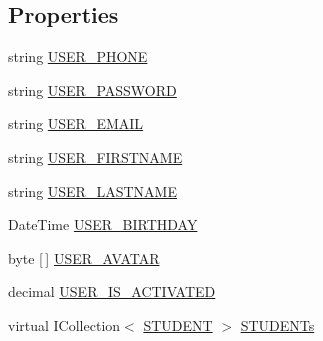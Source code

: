 \subsection*{Properties}
\begin{DoxyCompactItemize}
\item 
string \hyperlink{class_e_f_oracle_1_1_model_1_1_u_s_e_r_af17afbb891a92e46288022d64b7a8393}{U\+S\+E\+R\+\_\+\+P\+H\+O\+NE}
\item 
string \hyperlink{class_e_f_oracle_1_1_model_1_1_u_s_e_r_a89dccb5c29dd3c072978fc465500c7af}{U\+S\+E\+R\+\_\+\+P\+A\+S\+S\+W\+O\+RD}
\item 
string \hyperlink{class_e_f_oracle_1_1_model_1_1_u_s_e_r_a8f3418b6e13510654282c0079b2b52d5}{U\+S\+E\+R\+\_\+\+E\+M\+A\+IL}
\item 
string \hyperlink{class_e_f_oracle_1_1_model_1_1_u_s_e_r_a92206079968e1447584054eb4da2be62}{U\+S\+E\+R\+\_\+\+F\+I\+R\+S\+T\+N\+A\+ME}
\item 
string \hyperlink{class_e_f_oracle_1_1_model_1_1_u_s_e_r_a1521baf6b374d79498dc8d875190a772}{U\+S\+E\+R\+\_\+\+L\+A\+S\+T\+N\+A\+ME}
\item 
Date\+Time \hyperlink{class_e_f_oracle_1_1_model_1_1_u_s_e_r_a20f6ec89e28a3aa3dfd8b934dce96368}{U\+S\+E\+R\+\_\+\+B\+I\+R\+T\+H\+D\+AY}
\item 
byte \mbox{[}$\,$\mbox{]} \hyperlink{class_e_f_oracle_1_1_model_1_1_u_s_e_r_aada09caebf78d842b47abada413e5c90}{U\+S\+E\+R\+\_\+\+A\+V\+A\+T\+AR}
\item 
decimal \hyperlink{class_e_f_oracle_1_1_model_1_1_u_s_e_r_a657bb6066915190f224c4fd7643ba413}{U\+S\+E\+R\+\_\+\+I\+S\+\_\+\+A\+C\+T\+I\+V\+A\+T\+ED}
\item 
virtual I\+Collection$<$ \hyperlink{class_e_f_oracle_1_1_model_1_1_s_t_u_d_e_n_t}{S\+T\+U\+D\+E\+NT} $>$ \hyperlink{class_e_f_oracle_1_1_model_1_1_u_s_e_r_a4f9c5bb7b6fff133bd167b6f9e7ce81c}{S\+T\+U\+D\+E\+N\+Ts}

\end{DoxyCompactItemize}
